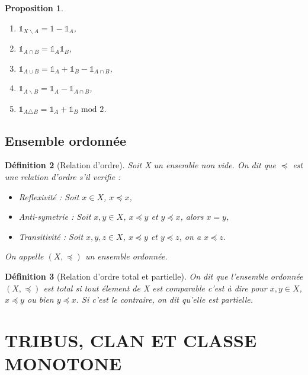 \documentclass[a4paper,12pt,french]{report}
\theoremstyle{break}
\newtheorem{defin}{Définition}[section]
\newtheorem{prop}[defin]{Proposition}
\begin{document}
\begin{prop}
       \begin{enumerate}
              \item $\mathds{1}_{X\backslash A} = 1 - \mathds{1}_{A}$,
              \item $\mathds{1}_{A \cap B} = \mathds{1}_{A} \mathds{1}_{B}$,
              \item $\mathds{1}_{A \cup B} = \mathds{1}_{A} + \mathds{1}_{B} - \mathds{1}_{A \cap B}$,
              \item $\mathds{1}_{A \backslash B} = \mathds{1}_{A} - \mathds{1}_{A \cap B}$,
              \item $\mathds{1}_{A \triangle B} = \mathds{1}_{A} + \mathds{1}_{B} \mbox{ mod } 2$.
       \end{enumerate}
\end{prop}

\section{Ensemble ordonnée}
\begin{defin}[Relation d'ordre]
       Soit X un ensemble non vide. On dit que  $\preccurlyeq$ est une relation d'ordre s'il verifie :
       \begin{itemize}
              \item[i)] Reflexivité : Soit $x \in X$, $x \preccurlyeq x$,
              \item[ii)] Anti-symetrie : Soit $x, y \in X$, $x \preccurlyeq y$ et $y \preccurlyeq x$, alors $x=y$,
              \item[iii)] Transitivité : Soit $x, y, z \in X$, $x \preccurlyeq y$ et $y \preccurlyeq z$, on a $x \preccurlyeq z$.   
       \end{itemize}
       On appelle $(X, \preccurlyeq)$ un ensemble ordonnée.
\end{defin}

\begin{defin}[Relation d'ordre total et partielle]
       On dit que l'ensemble ordonnée $(X, \preccurlyeq)$ est total si tout élement de X est comparable c'est à dire pour $x, y \in X$, $x \preccurlyeq y$ ou bien $y \preccurlyeq x$.
       Si c'est le contraire, on dit qu'elle est partielle.
\end{defin}

\chapter{TRIBUS, CLAN ET CLASSE MONOTONE}
\end{document}
